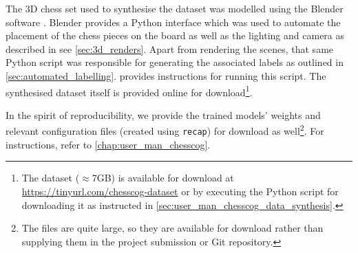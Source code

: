 \documentclass[../report.tex]{subfiles}
\begin{document}
The 3D chess set used to synthesise the dataset was modelled using the Blender software \cite{blender}.
Blender provides a Python interface which was used to automate the placement of the chess pieces on the board as well as the lighting and camera as described in see \cref{sec:3d_renders}.
Apart from rendering the scenes, that same Python script was responsible for generating the associated labels as outlined in \cref{sec:automated_labelling}.
 provides instructions for running this script.
The synthesised dataset itself is provided online for download\footnote{The dataset ($\approx$7GB) is available for download at \url{https://tinyurl.com/chesscog-dataset} or by executing the Python script for downloading it as instructed in \cref{sec:user_man_chesscog_data_synthesis}.}.

In the spirit of reproducibility, we provide the trained models' weights and relevant configuration files (created using \texttt{recap}) for download as well\footnote{The files are quite large, so they are available for download rather than supplying them in the project submission or Git repository.}.
For instructions, refer to \cref{chap:user_man_chesscog}.
\end{document}
